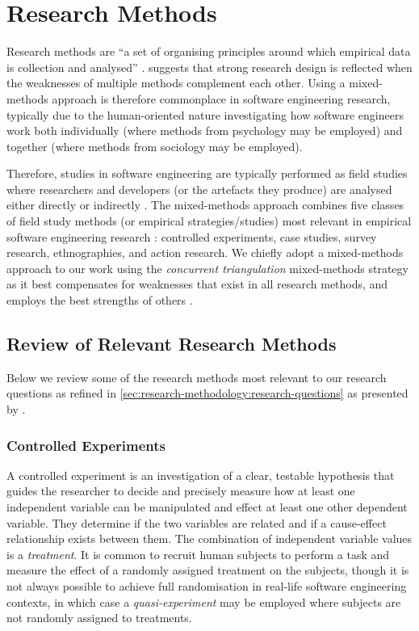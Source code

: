 \section{Research Methods}
\label{sec:research-methodology:review}

Research methods are ``a set of organising principles around which empirical data is collection and analysed'' \citep{Easterbrook:2007ws}. \citet{Creswell:2017vn} suggests that strong research design is reflected when the weaknesses of multiple methods complement each other. Using a mixed-methods approach is therefore commonplace in software engineering research, typically due to the human-oriented nature investigating how software engineers work both individually (where methods from psychology may be employed) and together (where methods from sociology may be employed).

Therefore, studies in software engineering are typically performed as field studies where researchers and developers (or the artefacts they produce) are analysed either directly or indirectly \citep{Singer:2007tu}. The mixed-methods approach combines five classes of field study methods (or empirical strategies/studies) most relevant in empirical software engineering research \citep{Easterbrook:2007ws, Wohlin:2012bu, Juristo:2013vj}: controlled experiments, case studies, survey research, ethnographies, and action research. We chiefly adopt a mixed-methods approach to our work using the \textit{concurrent triangulation} mixed-methods strategy \citep{Jick:1979el} as it best compensates for weaknesses that exist in all research methods, and employs the best strengths of others \citep{Creswell:2017vn}.

\subsection{Review of Relevant Research Methods}
\label{ssec:research-methodology:review:methods}

Below we review some of the research methods most relevant to our research questions as refined in \cref{sec:research-methodology:research-questions} as presented by \citet{Easterbrook:2007ws}.

\subsubsection{Controlled Experiments}
A controlled experiment is an investigation of a clear, testable hypothesis that guides the researcher to decide and precisely measure how at least one independent variable can be manipulated and effect at least one other dependent variable. They determine if the two variables are related and if a cause-effect relationship exists between them. The combination of independent variable values is a \textit{treatment}. It is common to recruit human subjects to perform a task and measure the effect of a randomly assigned treatment on the subjects, though it is not always possible to achieve full randomisation in real-life software engineering contexts, in which case a \textit{quasi-experiment} may be employed where subjects are not randomly assigned to treatments.

